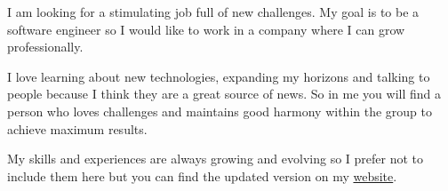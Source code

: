 \documentclass[9pt]{developercv} %
\begin{document}
\begin{minipage}[t]{0.3\textwidth}
	\vspace{-\baselineskip} %


	I am looking for a stimulating job full of new challenges.
	My goal is to be a software engineer so I would like to work in a company where
	I can grow professionally.
\end{minipage}
\hfill
\begin{minipage}[t]{0.3\textwidth}
	\vspace{-\baselineskip} %


	I love learning about new technologies,
	expanding my horizons and talking to people because I think they are a great source of news.
	So in me you will find a person who loves challenges and maintains good harmony within
	the group to achieve maximum results.
\end{minipage}
\hfill
\begin{minipage}[t]{0.3\textwidth}
	\vspace{-\baselineskip} %
	
	
	My skills and experiences are always growing and evolving so I prefer not to include them here 
	but you can find the updated version on my \href{https://dagyu.netlify.app/}{website}.
\end{minipage}


\end{document}
